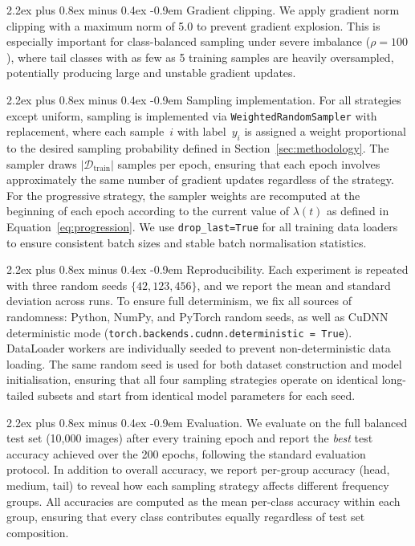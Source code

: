 \documentclass[12pt,a4paper]{article}
\makeatletter
\renewcommand{\paragraph}{\@startsection{paragraph}{4}{\z@}%
  {2.2ex plus 0.8ex minus 0.4ex}%
  {-0.9em}%
  {\normalfont\normalsize\bfseries}}
\makeatother
\begin{document}
\paragraph{Gradient clipping.} We apply gradient norm clipping with a maximum norm of 5.0 to prevent gradient explosion. This is especially important for class-balanced sampling under severe imbalance ($\rho = 100$), where tail classes with as few as 5 training samples are heavily oversampled, potentially producing large and unstable gradient updates.

\paragraph{Sampling implementation.} For all strategies except uniform, sampling is implemented via \texttt{WeightedRandomSampler} with replacement, where each sample~$i$ with label~$y_i$ is assigned a weight proportional to the desired sampling probability defined in Section~\ref{sec:methodology}. The sampler draws $|\mathcal{D}_{\mathrm{train}}|$ samples per epoch, ensuring that each epoch involves approximately the same number of gradient updates regardless of the strategy. For the progressive strategy, the sampler weights are recomputed at the beginning of each epoch according to the current value of $\lambda(t)$ as defined in Equation~\eqref{eq:progression}. We use \texttt{drop\_last=True} for all training data loaders to ensure consistent batch sizes and stable batch normalisation statistics.

\paragraph{Reproducibility.} Each experiment is repeated with three random seeds $\{42, 123, 456\}$, and we report the mean and standard deviation across runs. To ensure full determinism, we fix all sources of randomness: Python, NumPy, and PyTorch random seeds, as well as CuDNN deterministic mode (\texttt{torch.backends.cudnn.deterministic = True}). DataLoader workers are individually seeded to prevent non-deterministic data loading. The same random seed is used for both dataset construction and model initialisation, ensuring that all four sampling strategies operate on identical long-tailed subsets and start from identical model parameters for each seed.

\paragraph{Evaluation.} We evaluate on the full balanced test set (10,000 images) after every training epoch and report the \emph{best} test accuracy achieved over the 200 epochs, following the standard evaluation protocol. In addition to overall accuracy, we report per-group accuracy (head, medium, tail) to reveal how each sampling strategy affects different frequency groups. All accuracies are computed as the mean per-class accuracy within each group, ensuring that every class contributes equally regardless of test set composition.
\end{document}
